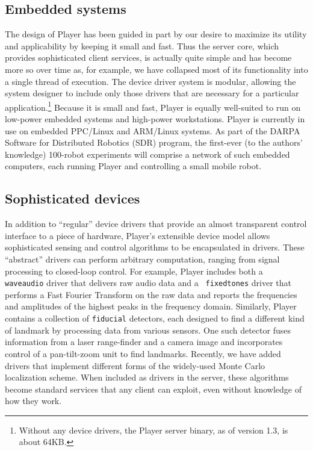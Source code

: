 \documentclass[a4paper]{ICAR2003}
\begin{document}
\subsection{Embedded systems}
The design of Player has been guided in part by our desire to maximize
its utility and applicability by keeping it small and fast.  Thus the
server core, which provides sophisticated client services, is actually
quite simple and has become more so over time as, for example, we have
collapsed most of its functionality into a single thread of execution.
The device driver system is modular, allowing the system designer to
include only those drivers that are necessary for a particular
application.\footnote{Without any device drivers, the Player server
  binary, as of version 1.3, is about 64KB.}  Because it is
small and fast, Player is equally well-suited to run on low-power
embedded systems and high-power workstations.  Player is currently
in use on embedded PPC/Linux and ARM/Linux systems.  As part of the
DARPA Software for Distributed Robotics (SDR) program, the first-ever
(to the authors' knowledge) 100-robot experiments will comprise a network
of such embedded computers, each running Player and controlling a small
mobile robot.

\subsection{Sophisticated devices}
\label{sect:soph-dev}
In addition to ``regular'' device drivers that provide an almost
transparent control interface to a piece of hardware, Player's
extensible device model allows sophisticated sensing and control
algorithms to be encapsulated in drivers.  These ``abstract'' drivers
can perform arbitrary computation, ranging from signal processing to
closed-loop control.  For example, Player includes both a {\tt
  waveaudio} driver that delivers raw audio data and a {\tt
  fixedtones} driver that performs a Fast Fourier Transform on the raw
data and reports the frequencies and amplitudes of the highest peaks
in the frequency domain.  Similarly, Player contains a collection of
{\tt fiducial} detectors, each designed to find a different kind of
landmark by processing data from various sensors.  One such detector
fuses information from a laser range-finder and a camera image and
incorporates control of a pan-tilt-zoom unit to find landmarks.
Recently, we have added drivers that implement different forms of the
widely-used Monte Carlo localization scheme.  When included as drivers
in the server, these algorithms become standard services that any
client can exploit, even without knowledge of how they work.
\end{document}
